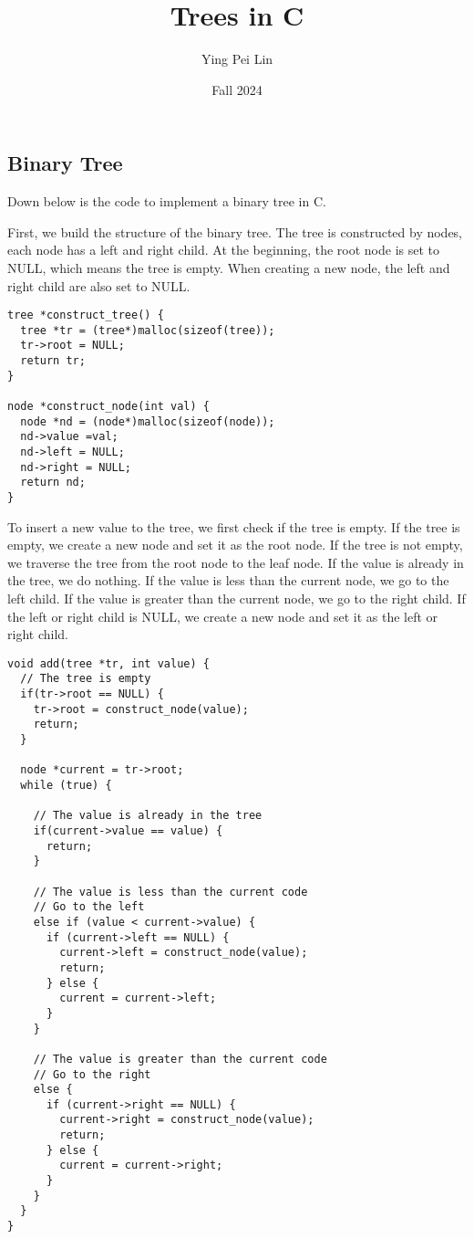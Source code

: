 \documentclass[a4paper,11pt]{article}
\begin{document}
\title{
  \textbf{Trees in C}
}
\author{Ying Pei Lin}
\date{Fall 2024}

\maketitle

\subsection*{Binary Tree}

Down below is the code to implement a binary tree in C.

First, we build the structure of the binary tree. The tree is 
constructed by nodes, each node has a left and right child. At the 
beginning, the root node is set to NULL, which means the tree is empty.
When creating a new node, the left and right child are also set to NULL.

\begin{verbatim}
tree *construct_tree() { 
  tree *tr = (tree*)malloc(sizeof(tree));
  tr->root = NULL;
  return tr;
}

node *construct_node(int val) {
  node *nd = (node*)malloc(sizeof(node));
  nd->value =val;
  nd->left = NULL;
  nd->right = NULL;
  return nd;
}
\end{verbatim}

To insert a new value to the tree, we first check if the tree is empty.
If the tree is empty, we create a new node and set it as the root node.
If the tree is not empty, we traverse the tree from the root node to the
leaf node. If the value is already in the tree, we do nothing. If the value
is less than the current node, we go to the left child. If the value is greater
than the current node, we go to the right child. If the left or right child is
NULL, we create a new node and set it as the left or right child.

\begin{verbatim}
void add(tree *tr, int value) {
  // The tree is empty
  if(tr->root == NULL) {
    tr->root = construct_node(value);
    return;
  }

  node *current = tr->root;
  while (true) {

    // The value is already in the tree
    if(current->value == value) {
      return;
    }

    // The value is less than the current code
    // Go to the left
    else if (value < current->value) {
      if (current->left == NULL) {
        current->left = construct_node(value);
        return;
      } else {
        current = current->left;
      }
    }
    
    // The value is greater than the current code
    // Go to the right
    else {
      if (current->right == NULL) {
        current->right = construct_node(value);
        return;
      } else {
        current = current->right;
      }
    }
  }
}
\end{verbatim}
\end{document}
